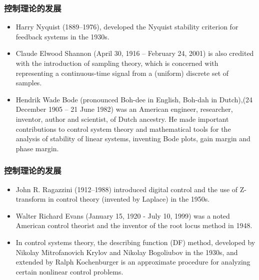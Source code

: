 \documentclass{article}
\begin{document}
\begin{frame}
\frametitle{控制理论的发展}
\label{sec-1-1-9}

\begin{itemize}
\item <1> Harry Nyquist (1889–1976), developed the Nyquist stability criterion for feedback systems in the 1930s.
\item <2> Claude Elwood Shannon (April 30, 1916 – February 24, 2001) is also credited with the introduction of sampling theory, which is concerned with representing a continuous-time signal from a (uniform) discrete set of samples.
\end{itemize}
\begin{itemize}
\item <3> Hendrik Wade Bode (pronounced Boh-dee in English, Boh-dah in Dutch),(24 December 1905 – 21 June 1982) was an American engineer, researcher, inventor, author and scientist, of Dutch ancestry.
      He made important contributions to control system theory and mathematical tools for the analysis of stability of linear systems, inventing Bode plots, gain margin and phase margin.
\end{itemize}
\end{frame}
\begin{frame}
\frametitle{控制理论的发展}
\label{sec-1-1-10}

\begin{itemize}
\item <1> John R. Ragazzini (1912–1988) introduced digital control and the use of Z-transform in control theory (invented by Laplace) in the 1950s.
\item <2> Walter Richard Evans (January 15, 1920 - July 10, 1999) was a noted American control theorist and the inventor of the root locus method in 1948.
\item <3> In control systems theory, the describing function (DF) method, developed by Nikolay Mitrofanovich Krylov and Nikolay Bogoliubov in the 1930s, and extended by Ralph Kochenburger is an approximate procedure for analyzing certain nonlinear control problems.
\end{itemize}
\end{frame}
\end{document}
